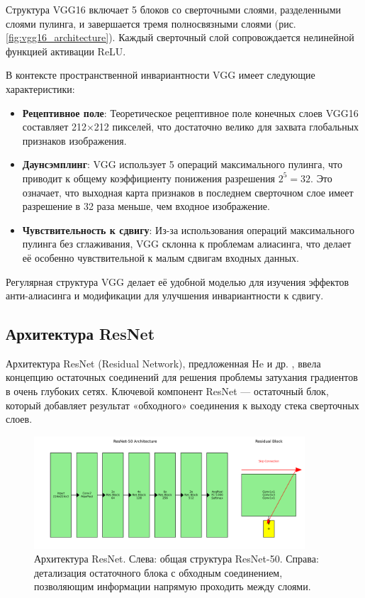 Структура VGG16 включает 5 блоков со сверточными слоями, разделенными слоями пулинга, и завершается тремя полносвязными слоями (рис. \ref{fig:vgg16_architecture}). Каждый сверточный слой сопровождается нелинейной функцией активации ReLU.

В контексте пространственной инвариантности VGG имеет следующие характеристики:

\begin{itemize}
    \item \textbf{Рецептивное поле}: Теоретическое рецептивное поле конечных слоев VGG16 составляет 212×212 пикселей, что достаточно велико для захвата глобальных признаков изображения.
    
    \item \textbf{Даунсэмплинг}: VGG использует 5 операций максимального пулинга, что приводит к общему коэффициенту понижения разрешения $2^5 = 32$. Это означает, что выходная карта признаков в последнем сверточном слое имеет разрешение в 32 раза меньше, чем входное изображение.
    
    \item \textbf{Чувствительность к сдвигу}: Из-за использования операций максимального пулинга без сглаживания, VGG склонна к проблемам алиасинга, что делает её особенно чувствительной к малым сдвигам входных данных.
\end{itemize}

Регулярная структура VGG делает её удобной моделью для изучения эффектов анти-алиасинга и модификации для улучшения инвариантности к сдвигу.

\subsection{Архитектура ResNet}
\label{theory:architectures:resnet}

Архитектура ResNet (Residual Network), предложенная He и др. \cite{He2016}, ввела концепцию остаточных соединений для решения проблемы затухания градиентов в очень глубоких сетях. Ключевой компонент ResNet — остаточный блок, который добавляет результат «обходного» соединения к выходу стека сверточных слоев.

\begin{figure}[ht]
\centering
\includegraphics[width=0.9\textwidth]{Dissertation/images/resnet_architecture.png}
\caption{Архитектура ResNet. Слева: общая структура ResNet-50. Справа: детализация остаточного блока с обходным соединением, позволяющим информации напрямую проходить между слоями.}
\label{fig:resnet_architecture}
\end{figure}

